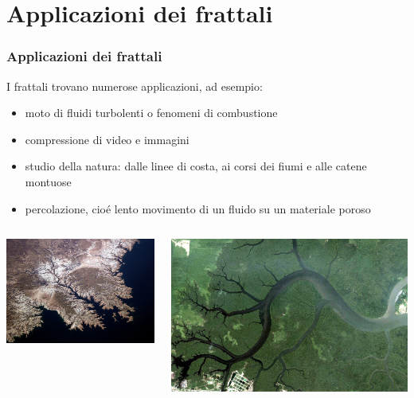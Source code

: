\documentclass{beamer}
\begin{document}
	\section{Applicazioni dei frattali}
		\begin{frame}
			\frametitle{Applicazioni dei frattali}
			I frattali trovano numerose applicazioni, ad esempio:
			\begin{itemize}
				\item moto di fluidi turbolenti o fenomeni di combustione
				\item compressione di video e immagini
				\item studio della natura: dalle linee di costa, ai corsi dei fiumi e alle catene montuose
				\item percolazione, cioé lento movimento di un fluido su un materiale poroso
			\end{itemize} 
			\begin{columns}
				\begin{column}{0.5\textwidth}
					\begin{center}
						\includegraphics[width=0.7\linewidth]{"../Frattali in natura/coast"}
					\end{center}
				\end{column}
				\begin{column}{0.5\textwidth}
					\begin{center}
						\includegraphics[width=0.7\linewidth]{"../Frattali in natura/river"}
					\end{center}
				\end{column}
			\end{columns}
		\end{frame}
\end{document}
